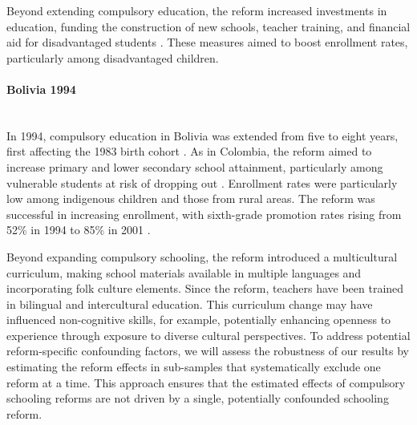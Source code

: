 Beyond extending compulsory education, the reform increased investments in education, funding the construction of new schools, teacher training, and financial aid for disadvantaged students \parencite{nguyen_trends_2004, cornelissen_multigenerational_2022}. These measures aimed to boost enrollment rates, particularly among disadvantaged children.


\paragraph{Bolivia 1994} \label{sec:bolivia} \mbox{}\\
In 1994, compulsory education in Bolivia was extended from five to eight years, first affecting the 1983 birth cohort \parencite{urbina_mass_2022}. As in Colombia, the reform aimed to increase primary and lower secondary school attainment, particularly among vulnerable students at risk of dropping out \parencite{unesco_situacion_2001}. Enrollment rates were particularly low among indigenous children and those from rural areas. The reform was successful in increasing enrollment, with sixth-grade promotion rates rising from 52\% in 1994 to 85\% in 2001 \parencite{contreras_bolivian_2003}.

Beyond expanding compulsory schooling, the reform introduced a multicultural curriculum, making school materials available in multiple languages and incorporating folk culture elements. Since the reform, teachers have been trained in bilingual and intercultural education. This curriculum change may have influenced non-cognitive skills, for example, potentially enhancing openness to experience through exposure to diverse cultural perspectives. To address potential reform-specific confounding factors, we will assess the robustness of our results by estimating the reform effects in sub-samples that systematically exclude one reform at a time. This approach ensures that the estimated effects of compulsory schooling reforms are not driven by a single, potentially confounded schooling reform.
